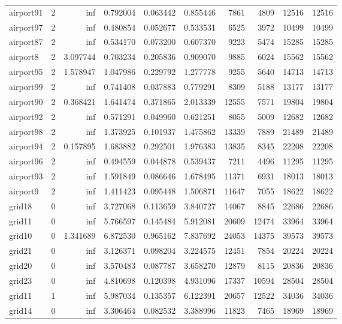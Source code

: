 \begin{longtable}{|l|r|r|r|r|r|r|r|r|r|}
airport91 & 2 & inf & 0.792004 & 0.063442 & 0.855446 & 7861 & 4809 & 12516 & 12516 \\
airport97 & 2 & inf & 0.480854 & 0.052677 & 0.533531 & 6525 & 3972 & 10499 & 10499 \\
airport87 & 2 & inf & 0.534170 & 0.073200 & 0.607370 & 9223 & 5474 & 15285 & 15285 \\
airport8 & 2 & 3.097744 & 0.703234 & 0.205836 & 0.909070 & 9885 & 6024 & 15562 & 15562 \\
airport95 & 2 & 1.578947 & 1.047986 & 0.229792 & 1.277778 & 9255 & 5640 & 14713 & 14713 \\
airport99 & 2 & inf & 0.741408 & 0.037883 & 0.779291 & 8309 & 5188 & 13177 & 13177 \\
airport90 & 2 & 0.368421 & 1.641474 & 0.371865 & 2.013339 & 12555 & 7571 & 19804 & 19804 \\
airport92 & 2 & inf & 0.571291 & 0.049960 & 0.621251 & 8055 & 5009 & 12682 & 12682 \\
airport98 & 2 & inf & 1.373925 & 0.101937 & 1.475862 & 13339 & 7889 & 21489 & 21489 \\
airport94 & 2 & 0.157895 & 1.683882 & 0.292501 & 1.976383 & 13835 & 8345 & 22208 & 22208 \\
airport96 & 2 & inf & 0.494559 & 0.044878 & 0.539437 & 7211 & 4496 & 11295 & 11295 \\
airport93 & 2 & inf & 1.591849 & 0.086646 & 1.678495 & 11371 & 6931 & 18013 & 18013 \\
airport9 & 2 & inf & 1.411423 & 0.095448 & 1.506871 & 11647 & 7055 & 18622 & 18622 \\
grid18 & 0 & inf & 3.727068 & 0.113659 & 3.840727 & 14067 & 8845 & 22686 & 22686 \\
grid11 & 0 & inf & 5.766597 & 0.145484 & 5.912081 & 20609 & 12474 & 33964 & 33964 \\
grid10 & 0 & 1.341689 & 6.872530 & 0.965162 & 7.837692 & 24053 & 14375 & 39573 & 39573 \\
grid21 & 0 & inf & 3.126371 & 0.098204 & 3.224575 & 12451 & 7854 & 20224 & 20224 \\
grid20 & 0 & inf & 3.570483 & 0.087787 & 3.658270 & 12879 & 8115 & 20836 & 20836 \\
grid23 & 0 & inf & 4.810698 & 0.120398 & 4.931096 & 17337 & 10594 & 28504 & 28504 \\
grid11 & 1 & inf & 5.987034 & 0.135357 & 6.122391 & 20657 & 12522 & 34036 & 34036 \\
grid14 & 0 & inf & 3.306464 & 0.082532 & 3.388996 & 11823 & 7465 & 18969 & 18969 \\

\end{longtable}
